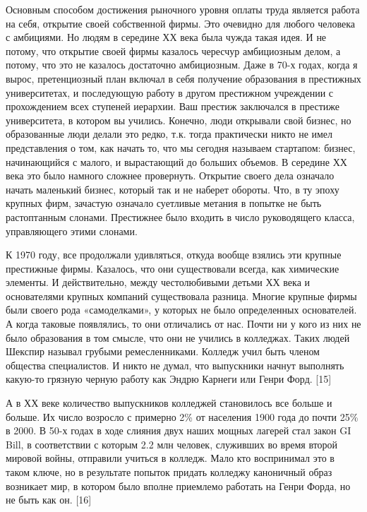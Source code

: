 \documentclass[ebook,12pt,oneside,openany]{memoir}
\begin{document}
Основным способом достижения рыночного уровня оплаты труда является
работа на себя, открытие своей собственной фирмы. Это очевидно для
любого человека с амбициями. Но людям в середине ХХ века была чужда
такая идея. И не потому, что открытие своей фирмы казалось чересчур
амбициозным делом, а потому, что это не казалось достаточно
амбициозным. Даже в 70-х годах, когда я вырос, претенциозный план
включал в себя получение образования в престижных университетах, и
последующую работу в другом престижном учреждении с прохождением всех
ступеней иерархии. Ваш престиж заключался в престиже университета, в
котором вы учились. Конечно, люди открывали свой бизнес, но
образованные люди делали это редко, т.к. тогда практически никто не
имел представления о том, как начать то, что мы сегодня называем
стартапом: бизнес, начинающийся с малого, и вырастающий до больших
объемов. В середине ХХ века это было намного сложнее провернуть.
Открытие своего дела означало начать маленький бизнес, который так и
не наберет обороты. Что, в ту эпоху крупных фирм, зачастую означало
суетливые метания в попытке не быть растоптанным слонами. Престижнее
было входить в число руководящего класса, управляющего этими слонами. \newline

К 1970 году, все продолжали удивляться, откуда вообще взялись эти
крупные престижные фирмы. Казалось, что они существовали всегда, как
химические элементы. И действительно, между честолюбивыми детьми ХХ
века и основателями крупных компаний существовала разница. Многие
крупные фирмы были своего рода «самоделками», у которых не было
определенных основателей. А когда таковые появлялись, то они
отличались от нас. Почти ни у кого из них не было образования в том
смысле, что они не учились в колледжах. Таких людей Шекспир называл
грубыми ремесленниками. Колледж учил быть членом общества
специалистов. И никто не думал, что выпускники начнут выполнять
какую-то грязную черную работу как Эндрю Карнеги или Генри Форд. [15] \newline

А в ХХ веке количество выпускников колледжей становилось все больше и
больше. Их число возросло с примерно 2\% от населения 1900 года до
почти 25\% в 2000. В 50-х годах в ходе слияния двух наших мощных
лагерей стал закон GI Bill, в соответствии с которым 2.2 млн человек,
служивших во время второй мировой войны, отправили учиться в колледж.
Мало кто воспринимал это в таком ключе, но в результате попыток
придать колледжу каноничный образ возникает мир, в котором было вполне
приемлемо работать на Генри Форда, но не быть как он. [16] \newline
\end{document}
